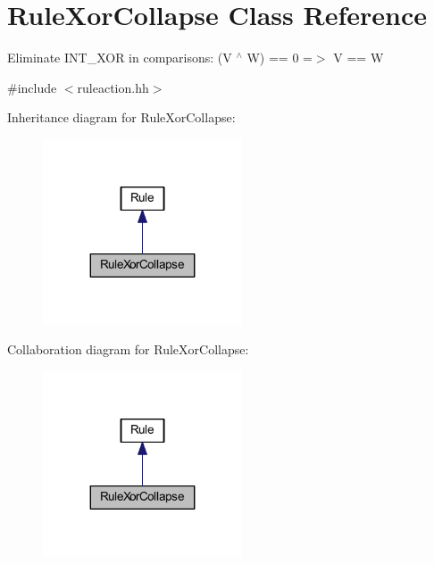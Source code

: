 \hypertarget{class_rule_xor_collapse}{}\section{Rule\+Xor\+Collapse Class Reference}
\label{class_rule_xor_collapse}


Eliminate I\+N\+T\+\_\+\+X\+OR in comparisons\+: {\ttfamily (V $^\wedge$ W) == 0 =$>$ V == W}  




{\ttfamily \#include $<$ruleaction.\+hh$>$}



Inheritance diagram for Rule\+Xor\+Collapse\+:
\nopagebreak
\begin{figure}[H]
\begin{center}
\leavevmode
\includegraphics[width=167pt]{class_rule_xor_collapse__inherit__graph}
\end{center}
\end{figure}


Collaboration diagram for Rule\+Xor\+Collapse\+:
\nopagebreak
\begin{figure}[H]
\begin{center}
\leavevmode
\includegraphics[width=167pt]{class_rule_xor_collapse__coll__graph}
\end{center}
\end{figure}
